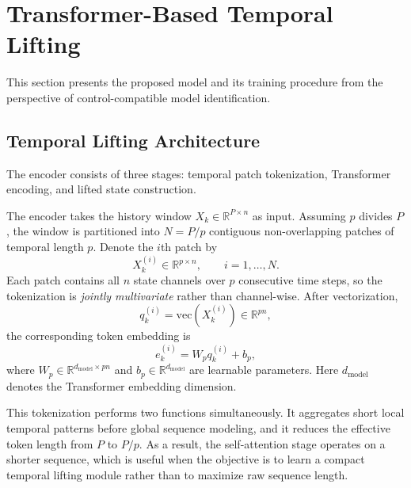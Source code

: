 \documentclass[journal]{IEEEtran}
\begin{document}
\section{Transformer-Based Temporal Lifting}
\label{sec:methodology}

This section presents the proposed model and its training procedure from the perspective of control-compatible model identification.

\subsection{Temporal Lifting Architecture}
\label{sec:temporal_lifting}

The encoder consists of three stages: temporal patch tokenization, Transformer encoding, and lifted state construction.

The encoder takes the history window $X_k \in \mathbb{R}^{P\times n}$ as input. Assuming $p$ divides $P$, the window is partitioned into $N=P/p$ contiguous non-overlapping patches of temporal length $p$. Denote the $i$th patch by
\begin{equation}
    X_k^{(i)} \in \mathbb{R}^{p\times n}, \qquad i=1,\ldots,N.
\end{equation}
Each patch contains all $n$ state channels over $p$ consecutive time steps, so the tokenization is \emph{jointly multivariate} rather than channel-wise. After vectorization,
\begin{equation}
    q_k^{(i)} = \mathrm{vec}(X_k^{(i)}) \in \mathbb{R}^{pn},
\end{equation}
the corresponding token embedding is
\begin{equation}
    e_k^{(i)} = W_p q_k^{(i)} + b_p,
    \label{eq:patch_embedding}
\end{equation}
where $W_p \in \mathbb{R}^{d_{\mathrm{model}}\times pn}$ and $b_p \in \mathbb{R}^{d_{\mathrm{model}}}$ are learnable parameters. Here $d_{\mathrm{model}}$ denotes the Transformer embedding dimension.

This tokenization performs two functions simultaneously. It aggregates short local temporal patterns before global sequence modeling, and it reduces the effective token length from $P$ to $P/p$. As a result, the self-attention stage operates on a shorter sequence, which is useful when the objective is to learn a compact temporal lifting module rather than to maximize raw sequence length.
\end{document}
